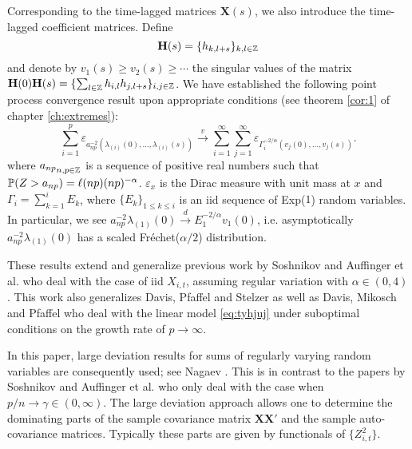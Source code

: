 Corresponding to the time-lagged matrices $\mathbf X(s)$, we also introduce
the time-lagged coefficient matrices. Define
\[
\mathbf H(s) = \{h_{k, l+s}\}_{k, l \in \integers}
\]
and denote by $v_1(s) \geq v_2(s) \geq \cdots$ the singular values of
the matrix
$\mathbf H(0) \mathbf H(s) = \{\sum_{l \in \integers} h_{i,l} h_{j,l+s}\}_{i,j \in \integers}$.
We have established the following point process convergence result
upon appropriate conditions (see theorem \ref{cor:1} of chapter
\ref{ch:extremes}):
\[
\sum_{i=1}^p \varepsilon_{a_{np}^{-2}(\lambda_{(i)}(0), \ldots, \lambda_{(i)}(s))}
\overset{v}{\to}
\sum_{i=1}^\infty \sum_{j=1}^\infty
\varepsilon_{\Gamma_i^{-2/\alpha}(v_j(0), \ldots, v_j(s))}.
\]
where ${a_{np}}_{n,p \in \integers}$ is a sequence of positive real
numbers such that $\P(Z > a_{np}) = \ell(np) (np)^{-\alpha}$.
$\varepsilon_{x}$ is the Dirac measure with unit mass at $x$ and
$\Gamma_i = \sum_{k=1}^i E_k$, where $\{E_k\}_{1 \leq k \leq i}$ is
an iid sequence of Exp($1$) random variables. In particular, we see
$a_{np}^{-2}\lambda_{(1)}(0) \overset{d}{\to} E_1^{-2/\alpha} v_1(0)$, i.e.
asymptotically $a_{np}^{-2}\lambda_{(1)}(0)$ has a scaled
Fréchet($\alpha/2$) distribution.

These results extend and generalize previous work by Soshnikov
\cite{soshnikov:2004} and Auffinger et
al. \cite{auffinger:arous:peche:2009} who deal with the case of iid
$X_{i,t}$, assuming regular variation with $\alpha \in (0, 4)$. This
work also generalizes Davis, Pfaffel and Stelzer
\cite{davis:pfaffel:stelzer:2014} as well as Davis, Mikosch and
Pfaffel \cite{davis:mikosch:oliver:2016} who deal with the linear
model \eqref{eq:tyhjuj} under suboptimal conditions on the growth rate
of $p \to \infty$.

In this paper, large deviation results for sums of regularly varying
random variables are consequently used; see Nagaev
\cite{nagaev1979}. This is in contrast to the papers by Soshnikov
\cite{soshnikov:2004}  and Auffinger et
al. \cite{auffinger:arous:peche:2009} who only deal with the case when
$p/n \to \gamma \in (0, \infty)$. The large deviation approach allows
one to determine the dominating parts of the sample covariance matrix
$\mathbf {XX'}$ and the sample auto-covariance matrices. Typically
these parts are given by functionals of $\{Z_{i,t}^2\}$.

